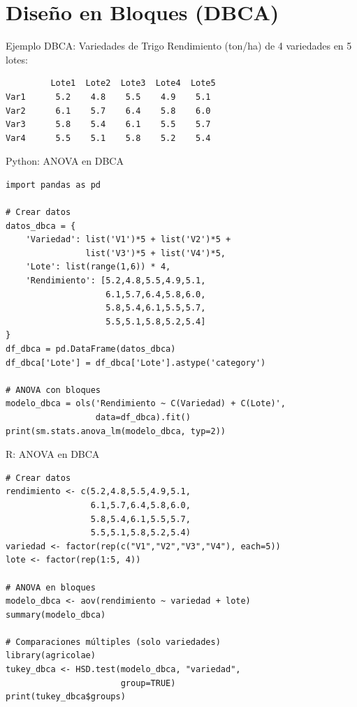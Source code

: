 \documentclass[aspectratio=169]{beamer}
\begin{document}
\section{Diseño en Bloques (DBCA)}

\begin{frame}[fragile]{Ejemplo DBCA: Variedades de Trigo}
\small
Rendimiento (ton/ha) de 4 variedades en 5 lotes:

\begin{verbatim}
         Lote1  Lote2  Lote3  Lote4  Lote5
Var1      5.2    4.8    5.5    4.9    5.1
Var2      6.1    5.7    6.4    5.8    6.0
Var3      5.8    5.4    6.1    5.5    5.7
Var4      5.5    5.1    5.8    5.2    5.4
\end{verbatim}
\end{frame}

\begin{frame}[fragile]{Python: ANOVA en DBCA}
\small
\begin{verbatim}
import pandas as pd

# Crear datos
datos_dbca = {
    'Variedad': list('V1')*5 + list('V2')*5 +
                list('V3')*5 + list('V4')*5,
    'Lote': list(range(1,6)) * 4,
    'Rendimiento': [5.2,4.8,5.5,4.9,5.1,
                    6.1,5.7,6.4,5.8,6.0,
                    5.8,5.4,6.1,5.5,5.7,
                    5.5,5.1,5.8,5.2,5.4]
}
df_dbca = pd.DataFrame(datos_dbca)
df_dbca['Lote'] = df_dbca['Lote'].astype('category')

# ANOVA con bloques
modelo_dbca = ols('Rendimiento ~ C(Variedad) + C(Lote)',
                  data=df_dbca).fit()
print(sm.stats.anova_lm(modelo_dbca, typ=2))
\end{verbatim}
\end{frame}

\begin{frame}[fragile]{R: ANOVA en DBCA}
\small
\begin{verbatim}
# Crear datos
rendimiento <- c(5.2,4.8,5.5,4.9,5.1,
                 6.1,5.7,6.4,5.8,6.0,
                 5.8,5.4,6.1,5.5,5.7,
                 5.5,5.1,5.8,5.2,5.4)
variedad <- factor(rep(c("V1","V2","V3","V4"), each=5))
lote <- factor(rep(1:5, 4))

# ANOVA en bloques
modelo_dbca <- aov(rendimiento ~ variedad + lote)
summary(modelo_dbca)

# Comparaciones múltiples (solo variedades)
library(agricolae)
tukey_dbca <- HSD.test(modelo_dbca, "variedad",
                       group=TRUE)
print(tukey_dbca$groups)
\end{verbatim}
\end{frame}
\end{document}
